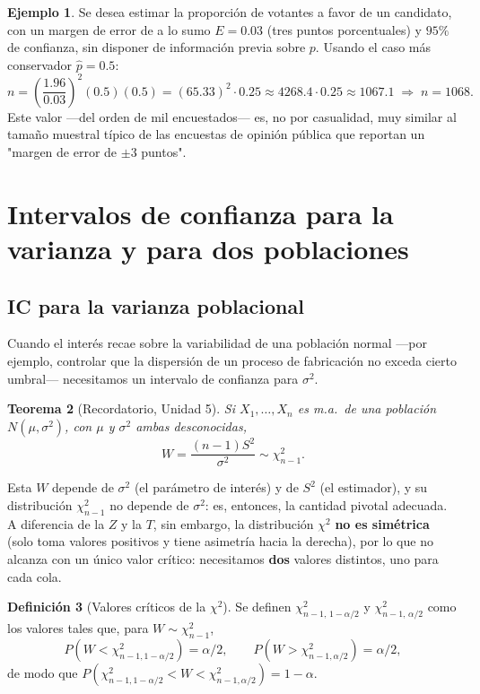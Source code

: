\documentclass[11pt,a4paper]{article}
\theoremstyle{plain}
\newtheorem{teorema}{Teorema}[section]
\theoremstyle{definition}
\newtheorem{definicion}[teorema]{Definición}
\newtheorem{ejemplo}[teorema]{Ejemplo}
\theoremstyle{remark}
\begin{document}
\begin{ejemplo}
Se desea estimar la proporción de votantes a favor de un candidato, con un margen de error de a lo sumo $E=0.03$ (tres puntos porcentuales) y $95\%$ de confianza, sin disponer de información previa sobre $p$. Usando el caso más conservador $\widehat p=0.5$:
\[
n = \left(\frac{1.96}{0.03}\right)^2 (0.5)(0.5) = (65.33)^2\cdot 0.25 \approx 4268.4\cdot 0.25 \approx 1067.1 \;\Longrightarrow\; n = 1068.
\]
Este valor —del orden de mil encuestados— es, no por casualidad, muy similar al tamaño muestral típico de las encuestas de opinión pública que reportan un "margen de error de $\pm 3$ puntos".
\end{ejemplo}

\newpage
\section{Intervalos de confianza para la varianza y para dos poblaciones}
\label{sec:icvar}

\subsection{IC para la varianza poblacional}

Cuando el interés recae sobre la variabilidad de una población normal —por ejemplo, controlar que la dispersión de un proceso de fabricación no exceda cierto umbral— necesitamos un intervalo de confianza para $\sigma^2$.

\begin{teorema}[Recordatorio, Unidad 5]
Si $X_1,\dots,X_n$ es m.a.\ de una población $N(\mu,\sigma^2)$, con $\mu$ y $\sigma^2$ ambas desconocidas,
\[
W = \frac{(n-1)S^2}{\sigma^2} \sim \chi^2_{n-1}.
\]
\end{teorema}

Esta $W$ depende de $\sigma^2$ (el parámetro de interés) y de $S^2$ (el estimador), y su distribución $\chi^2_{n-1}$ no depende de $\sigma^2$: es, entonces, la cantidad pivotal adecuada. A diferencia de la $Z$ y la $T$, sin embargo, la distribución $\chi^2$ \textbf{no es simétrica} (solo toma valores positivos y tiene asimetría hacia la derecha), por lo que no alcanza con un único valor crítico: necesitamos \textbf{dos} valores distintos, uno para cada cola.

\begin{definicion}[Valores críticos de la $\chi^2$]
Se definen $\chi^2_{n-1,\,1-\alpha/2}$ y $\chi^2_{n-1,\,\alpha/2}$ como los valores tales que, para $W\sim\chi^2_{n-1}$,
\[
P(W<\chi^2_{n-1,1-\alpha/2}) = \alpha/2, \qquad P(W>\chi^2_{n-1,\alpha/2}) = \alpha/2,
\]
de modo que $P(\chi^2_{n-1,1-\alpha/2} < W < \chi^2_{n-1,\alpha/2}) = 1-\alpha$.
\end{definicion}
\end{document}
